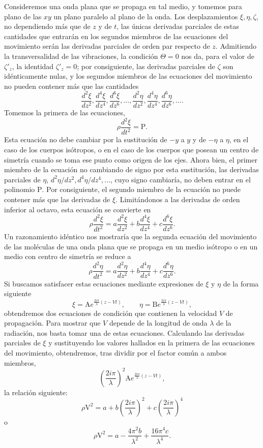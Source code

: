 Consideremos una onda plana que se propaga en tal medio, y tomemos para
plano de las $xy$ un plano paralelo al plano de la onda. Los desplazamientos
$\xi,\eta,\zeta$, no dependiendo más que de $z$ y de $t$, las únicas
derivadas parciales de estas cantidades que entrarán en los segundos
miembros de las ecuaciones del movimiento serán las derivadas parciales de
orden par respecto de $z$. Admitiendo la transversalidad de las vibraciones,
la condición $\Theta=0$ nos da, para el valor de $\zeta'_z$, la identidad
$\zeta'_z=0$; por consiguiente, las derivadas parciales de $\zeta$ son
idénticamente nulas, y los segundos miembros de las ecuaciones del
movimiento no pueden contener más que las cantidades
\[
\frac{d^2\xi}{dz^2},\frac{d^4\xi}{dz^4},\frac{d^6\xi}{dz^6},\ldots,
\frac{d^2\eta}{dz^2},\frac{d^4\eta}{dz^4},\frac{d^6\eta}{dz^6},\ldots.
\]
Tomemos la primera de las ecuaciones,
\[
\rho\frac{d^2\xi}{dt^2}=\mathrm P.
\]
Esta ecuación no debe cambiar por la sustitución de $-y$ a $y$ y de $-\eta$
a $\eta$, en el caso de los cuerpos isótropos, o en el caso de los cuerpos
que posean un centro de simetría cuando se toma ese punto como origen de
los ejes. Ahora bien, el primer miembro de la ecuación no cambiando de
signo por esta sustitución, las derivadas parciales de $\eta$,
$d^2\eta/dz^2,d^4\eta/dz^4,\ldots$, cuyo signo cambiaría, no deben entrar
en el polinomio $\mathrm P$. Por consiguiente, el segundo miembro de la
ecuación no puede contener más que las derivadas de $\xi$. Limitándonos a
las derivadas de orden inferior al octavo, esta ecuación se convierte en
\[
\rho\frac{d^2\xi}{dt^2}=a\frac{d^2\xi}{dz^2}+b\frac{d^4\xi}{dz^4}
+c\frac{d^6\xi}{dz^6}.
\]
Un razonamiento idéntico nos mostraría que la segunda ecuación del
movimiento de las moléculas de una onda plana que se propaga en un medio
isótropo o en un medio con centro de simetría se reduce a
\[
\rho\frac{d^2\eta}{dt^2}=a\frac{d^2\eta}{dz^2}+b\frac{d^4\eta}{dz^4}
+c\frac{d^6\eta}{dz^6}.
\]
Si buscamos satisfacer estas ecuaciones mediante expresiones de $\xi$ y
$\eta$ de la forma siguiente
\[
\xi=\mathrm Ae^{\frac{2i\pi}{\lambda}(z-Vt)},\qquad
\eta=\mathrm Be^{\frac{2i\pi}{\lambda}(z-Vt)},
\]
obtendremos dos ecuaciones de condición que contienen la velocidad $V$ de
propagación. Para mostrar que $V$ depende de la longitud de onda $\lambda$
de la radiación, nos basta tomar una de estas ecuaciones. Calculando las
derivadas parciales de $\xi$ y sustituyendo los valores hallados en la
primera de las ecuaciones del movimiento, obtendremos, tras dividir por el
factor común a ambos miembros,
\[
\left(\frac{2i\pi}{\lambda}\right)^2\mathrm Ae^{\frac{2i\pi}{\lambda}(z-Vt)},
\]
la relación siguiente:
\[
\rho\mathrm V^2=a+b\left(\frac{2i\pi}{\lambda}\right)^2
+c\left(\frac{2i\pi}{\lambda}\right)^4
\]
o
\[
\rho\mathrm V^2=a-\frac{4\pi^2 b}{\lambda^2}+\frac{16\pi^4c}{\lambda^4}.
\]

